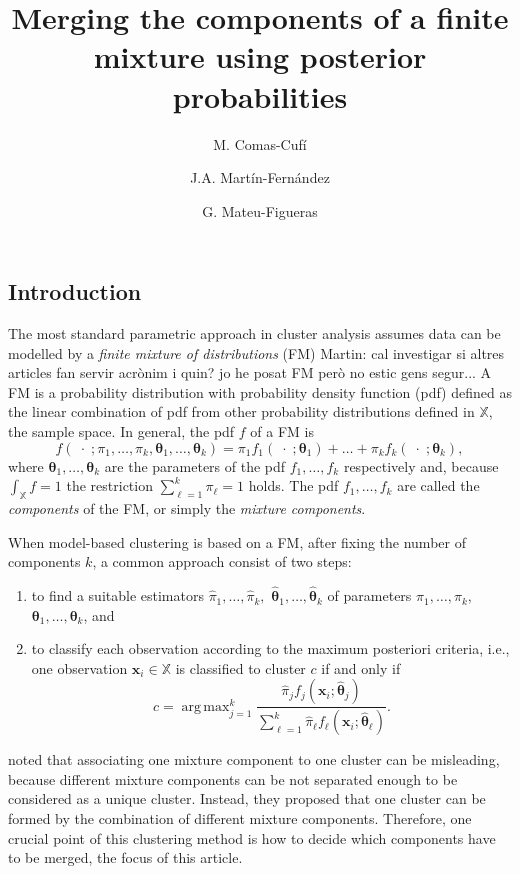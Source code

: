 \documentclass[10pt, a4paper]{article}
\title{Merging the components of a finite mixture using  posterior probabilities}
\author{M. Comas-Cufí \and J.A. Martín-Fernández \and G. Mateu-Figueras}
\DeclareMathOperator*{\argmax}{arg\,max}
\newcommand{\m}[1]{\boldsymbol{#1}}
\begin{document}
\begin{spacing}{1.9}


\maketitle

\section{Introduction}

The most standard parametric approach in cluster analysis assumes data can be modelled by a \emph{finite mixture of distributions} (FM){\color{blue} Martin: cal investigar si altres articles fan servir acrònim i quin? jo he posat FM però no estic gens segur..}. A FM is a probability distribution with probability density function (pdf) defined as the linear combination of pdf from other probability distributions defined in $\mathbb{X}$, the sample space. In general, the pdf $f$ of a FM is
\begin{equation}\label{mixt}
f(\;\cdot\; ; \pi_1, \dots, \pi_k, \m\theta_1, \dots, \m\theta_k) = \pi_1 f_1(\;\cdot\; ; \m\theta_1) + \dots + \pi_k f_k(\;\cdot\; ; \m\theta_k),
\end{equation}
where $\m\theta_1, \dots,  \m\theta_k$ are the parameters of the pdf $f_1, \dots, f_k$ respectively and, because $\int_{\mathbb{X}}f = 1$ the restriction $\sum_{\ell = 1}^k \pi_\ell = 1$ holds. The pdf $f_1, \dots, f_k$ are called the \emph{components} of the FM, or simply the \emph{mixture components}.


When model-based clustering is based on a FM, after fixing the number of components $k$, a common approach consist of two steps:
\begin{enumerate}
\item to find a suitable estimators $\hat{\pi}_1, \dots, \hat{\pi}_k,$ $\hat{\m\theta}_1, \dots, \hat{\m\theta}_k$ of parameters $\pi_1, \dots, \pi_k,$ $\m\theta_1, \dots, \m\theta_k$, and
\item to classify each observation according to the maximum posteriori criteria, i.e., one observation $\m x_i \in \mathbb{X}$ is classified to cluster $c$ if and only if
\[
c=\argmax_{j=1}^k \frac{ \hat{\pi}_j f_j(\m x_i ; \hat{\m\theta}_j) }{\sum_{\ell=1}^k \hat{\pi}_\ell f_\ell(\m x_i ; \hat{\m\theta}_\ell) }.
\]
\end{enumerate}


\cite{lee2004combining,hennig2010methods,baudry2010combining,melnykov2013distribution,pastore2013merging} noted that associating one mixture component to one cluster can be misleading, because different mixture components can be not separated enough to be considered as a unique cluster. Instead, they proposed that one cluster can be formed by the combination of different mixture components. Therefore, one crucial point of this clustering method is how to decide which components have to be merged, the focus of this article.


\end{spacing}
\end{document}
